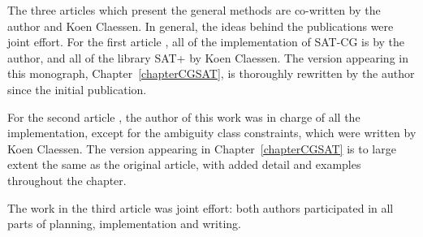 The three articles which present the general methods \cite{listenmaa_claessen2015,listenmaa_claessen2016,listenmaa_claessen2018} are co-written by the author and Koen Claessen.
In general, the ideas behind the publications were joint effort.
For the first article \cite{listenmaa_claessen2015}, all of the implementation of SAT-CG is by the author,
and all of the library SAT+ by Koen Claessen.
The version appearing in this monograph, Chapter~\ref{chapterCGSAT}, is thoroughly rewritten by the author since the initial publication.

For the second article \cite{listenmaa_claessen2016}, the author of this work was in charge of all the implementation, except for the ambiguity class constraints, which were written by Koen Claessen. 
The version appearing in Chapter~\ref{chapterCGSAT} is to large extent the same as the original article, with added detail and examples throughout the chapter.

The work in the third article \cite{listenmaa_claessen2018} was joint effort: both authors participated in all parts of planning, implementation and writing.


